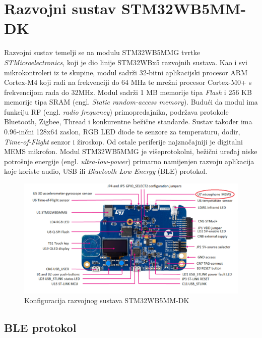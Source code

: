 \chapter{Razvojni sustav STM32WB5MM-DK}

Razvojni sustav temelji se na modulu STM32WB5MMG tvrtke \textit{STMicroelectronics}, koji je dio linije STM32WBx5 razvojnih sustava. Kao i svi mikrokontroleri iz te skupine, modul sadrži 32-bitni aplikacijski procesor ARM Cortex-M4 koji radi na frekvenciji do 64 MHz te mrežni procesor Cortex-M0+ s frekvencijom rada do 32MHz. Modul sadrži 1 MB memorije tipa \textit{Flash} i 256 KB memorije tipa SRAM (engl. \textit{Static random-access memory}).\cite{stm32manual} Budući da modul ima funkciju RF (engl. \textit{radio frequency}) primopredajnika, podržava protokole Bluetooth, Zigbee, Thread i konkurentne bežične standarde. Sustav također ima 0.96-inčni 128x64 zaslon, RGB LED diode te senzore za temperaturu, dodir, \textit{Time-of-Flight} senzor i žiroskop. Od ostale periferije najznačajniji je digitalni MEMS mikrofon. Modul STM32WB5MMG je višeprotokolni, bežični uređaj niske potrošnje energije (engl. \textit{ultra-low-power}) primarno namijenjen razvoju aplikacija koje koriste audio, USB ili \textit{Bluetooth Low Energy} (BLE) protokol. 

\begin{figure}[ht]
	\includegraphics[width=\linewidth]{imgs/discovery_kit}
	\caption{Konfiguracija razvojnog sustava STM32WB5MM-DK \cite{stm32manual}}
	\label{fig:discovery-kit}
\end{figure}

\section{BLE protokol}

